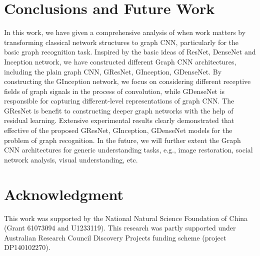 \documentclass[journal]{IEEEtran}
\begin{document}
\section{Conclusions and Future Work}
\label{sec:con}
In this work, we have given a comprehensive analysis of when work matters by transforming classical network structures to graph CNN, particularly for the basic graph recognition task.
Inspired by the basic ideas of ResNet, DenseNet and Inception network, we have constructed different Graph CNN architectures, including the plain graph CNN, G\underline{\hspace{0.5em}}ResNet, G\underline{\hspace{0.5em}}Inception, G\underline{\hspace{0.5em}}DenseNet.
By constructing the G\underline{\hspace{0.5em}}Inception network, we focus on considering different receptive fields of graph signals in the process of convolution, while G\underline{\hspace{0.5em}}DenseNet is responsible for capturing different-level representations of graph CNN.
The G\underline{\hspace{0.5em}}ResNet is benefit to constructing deeper graph networks with the help of residual learning.
Extensive experimental results clearly demonstrated that effective of the proposed G\underline{\hspace{0.5em}}ResNet, G\underline{\hspace{0.5em}}Inception, G\underline{\hspace{0.5em}}DenseNet models for the problem of graph recognition.
In the future, we will further extent the Graph CNN architectures for generic understanding tasks, e.g., image restoration, social network analysis, visual understanding, etc.






\section*{Acknowledgment}
This work was supported by the National Natural Science Foundation of China (Grant 61073094 and U1233119). This research was partly supported under Australian Research Council Discovery Projects funding scheme (project DP140102270).




	
	
	
	
	
	
\end{document}
